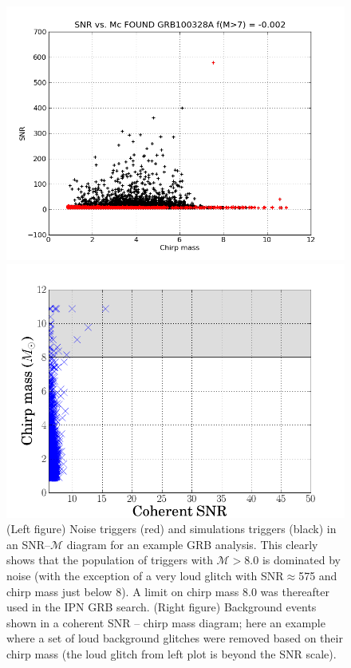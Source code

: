 \begin{figure}[htb]
\begin{minipage}{0.5\linewidth}
\centering
\includegraphics[scale=0.35]{Images/snr_mchirp.png}
\end{minipage}
\hspace{0.5cm}
\begin{minipage}{0.5\linewidth}
\centering
\includegraphics[scale=0.35]{Images/chirptest.png}
\end{minipage}
\caption{(Left figure) Noise triggers (red) and simulations triggers (black) in an SNR--$\mathcal{M}$ diagram for an example GRB analysis. This clearly shows that the population of triggers with $\mathcal{M}>8.0$ is dominated by noise (with the exception of a very loud glitch with SNR$\approx$575 and chirp mass just below 8). A limit on chirp mass 8.0 was thereafter used in the IPN GRB search. (Right figure) Background events shown in a coherent SNR -- chirp mass diagram; here an example where a set of loud background glitches were removed based on their chirp mass (the loud glitch from left plot is beyond the SNR scale).}
\label{chirptest}
\end{figure}

